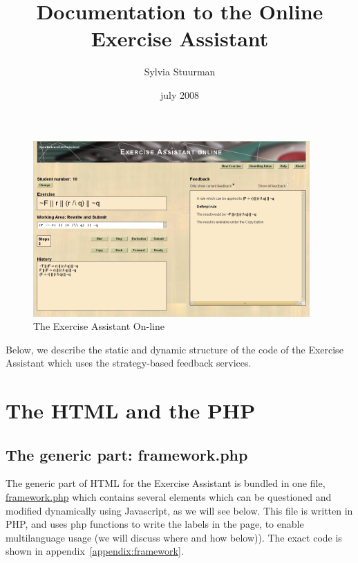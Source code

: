 \documentclass{article}
\begin{document}
\addtolength{\parskip}{0.2cm}
\newcommand{\todoservice}[1]{\vspace{0.2cm} \large \textbf{\underline{TODO Services:}}\\ \normalsize #1 }
\newcommand{\todoapp}[1]{\vspace{0.2cm} \large \textbf{\underline{TODO Application:}}\\ \normalsize #1 }
\title{Documentation to the Online Exercise Assistant}
\author{Sylvia Stuurman}
\date{july 2008}
\maketitle
\begin{figure}[h]
\begin{center}
\includegraphics{figures/page-elements.png}
\end{center}
\caption{The Exercise Assistant On-line}\label{figure:screenshot}
\end{figure}
Below, we describe the static and dynamic structure of the code of the Exercise Assistant which uses the strategy-based feedback services.

\section{The HTML and the PHP}
\subsection{The generic part: framework.php}
The generic part of HTML for the Exercise Assistant is bundled in one file, \url{framework.php} which contains several elements which can be questioned and modified dynamically using Javascript, as we will see below. This file is written in PHP, and uses php functions to write the labels in the page, to enable multilanguage usage (we will discuss where and how below)). The exact code is shown in appendix~\ref{appendix:framework}. 
\end{document}
